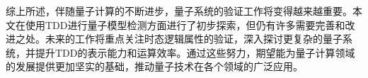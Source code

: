 综上所述，伴随量子计算的不断进步，量子系统的验证工作将变得越来越重要。本文在使用TDD进行量子模型检测方面进行了初步探索，但仍有许多需要完善和改进之处。未来的工作将重点关注时态逻辑属性的验证，深入探讨更复杂的量子系统，并提升TDD的表示能力和运算效率。通过这些努力，期望能为量子计算领域的发展提供更加坚实的基础，推动量子技术在各个领域的广泛应用。
